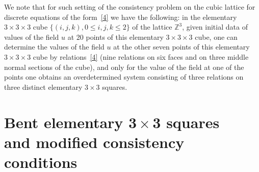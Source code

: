 \documentclass[pdftex]{sigma}
\begin{document}
We note that for such setting of the consistency problem on the
cubic lattice for discrete equations of the form~\eqref{4} we have
the following: in the elementary $3 \times 3 \times 3$ cube $\{(i,
j, k), 0 \leq i, j, k \leq 2 \}$ of the lattice $\mathbb{Z}^3$,
given initial data of values of the f\/ield $u$ at 20 points of this
elementary $3 \times 3 \times 3$ cube, one can determine the values
of the f\/ield $u$ at the other seven points of this elementary $3
\times 3 \times 3$ cube by relations~\eqref{4} (nine relations on
six faces and on three middle normal sections of the cube), and only
for the value of the f\/ield at one of the points one obtains an
overdetermined system consisting of three relations on three
distinct elementary $3 \times 3$ squares.




\section[Bent elementary $3 \times 3$ squares
and modified consistency conditions]{Bent elementary $\boldsymbol{3 \times 3}$ squares\\
and modif\/ied consistency conditions}
\end{document}
